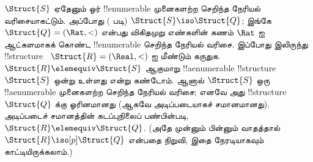 \documentclass[../../../include/open-logic-section]{subfiles}
\begin{document}
\begin{rem}
  $\Struct{S}$ ஏதேனும் ஓர் !!{enumerable} முனைகளற்ற செறிந்த நேரியல்
  வரிசையாகட்டும். அப்போது ( படி)
  $\Struct{S} \iso
  \Struct{Q}$; இங்கே $\Struct{Q} = (\Rat, <)$ என்பது விகிதமுறு எண்களின்
  கணம் $\Rat$ ஐ ஆட்களமாகக் கொண்ட !!{enumerable} செறிந்த நேரியல் வரிசை.
  இப்போது  இலிருந்து !!{structure}
  ~$\Struct{R} =
  (\Real, <)$ ஐ மீண்டும் கருதுக. $\Struct{R}
  \elemequiv \Struct{S}$ ஆகுமாறு !!a{enumerable} !!{structure}
  ~$\Struct{S}$ ஒன்று உள்ளது என்று கண்டோம். ஆனால் $\Struct{S}$ ஒரு
  !!a{enumerable} முனைகளற்ற செறிந்த நேரியல் வரிசை; எனவே அது
  !!{structure}~$\Struct{Q}$ க்கு ஓரினமானது (ஆகவே அடிப்படையாகச்
  சமானமானது). அடிப்படைச் சமானத்தின் கடப்புநிலைப் பண்பின்படி,
  $\Struct{R} \elemequiv
  \Struct{Q}$. (அதே முன்னும் பின்னும் வாதத்தால்
  $\Struct{R} \iso[p] \Struct{Q}$ என்பதை நிறுவி, இதை நேரடியாகவும்
  காட்டியிருக்கலாம்.)
\end{rem}
\end{document}
